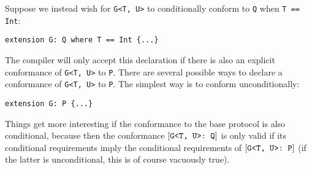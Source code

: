 \documentclass[../generics]{subfiles}
\begin{document}
Suppose we instead wish for \texttt{G<T, U>} to conditionally conform to \texttt{Q} when \texttt{T == Int}:
\begin{Verbatim}
extension G: Q where T == Int {...}
\end{Verbatim}
The compiler will only accept this declaration if there is also an explicit conformance of \texttt{G<T, U>} to \texttt{P}. There are several possible ways to declare a conformance of \texttt{G<T, U>} to \texttt{P}. The simplest way is to conform unconditionally:
\begin{Verbatim}
extension G: P {...}
\end{Verbatim}
Things get more interesting if the conformance to the base protocol is also conditional, because then the conformance $[\texttt{G<T, U>:~Q}]$ is only valid if its conditional requirements imply the conditional requirements of $[\texttt{G<T, U>:~P}]$ (if the latter is unconditional, this is of course vacuously true).
\end{document}
